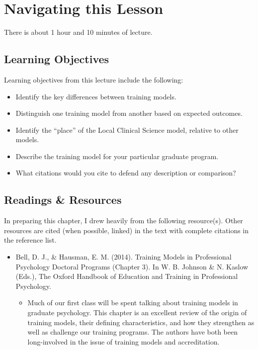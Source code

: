 \documentclass[
  english,
]{book}
\providecommand{\tightlist}{%
  \setlength{\itemsep}{0pt}\setlength{\parskip}{0pt}}
\begin{document}
\hypertarget{navigating-this-lesson}{%
\section{Navigating this Lesson}\label{navigating-this-lesson}}

There is about 1 hour and 10 minutes of lecture.

\hypertarget{learning-objectives}{%
\subsection{Learning Objectives}\label{learning-objectives}}

Learning objectives from this lecture include the following:

\begin{itemize}
\tightlist
\item
  Identify the key differences between training models.
\item
  Distinguish one training model from another based on expected outcomes.\\
\item
  Identify the ``place'' of the Local Clinical Science model, relative to other models.
\item
  Describe the training model for your particular graduate program.
\item
  What citations would you cite to defend any description or comparison?
\end{itemize}

\hypertarget{readings-resources}{%
\subsection{Readings \& Resources}\label{readings-resources}}

In preparing this chapter, I drew heavily from the following resource(s). Other resources are cited (when possible, linked) in the text with complete citations in the reference list.

\begin{itemize}
\tightlist
\item
  Bell, D. J., \& Hausman, E. M. (2014). Training Models in Professional Psychology Doctoral Programs (Chapter 3). In W. B. Johnson \& N. Kaslow (Eds.), The Oxford Handbook of Education and Training in Professional Psychology.

  \begin{itemize}
  \tightlist
  \item
    Much of our first class will be spent talking about training models in graduate psychology. This chapter is an excellent review of the origin of training models, their defining characteristics, and how they strengthen as well as challenge our training programs. The authors have both been long-involved in the issue of training models and accreditation.
  \end{itemize}
\end{itemize}
\end{document}

